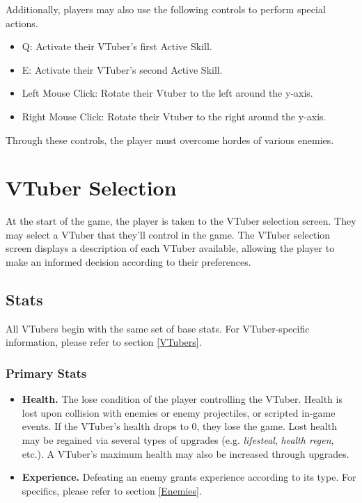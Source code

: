\documentclass[10pt, a4paper]{article}
\begin{document}
\begin{multicols}{2}
	Additionally, players may also use the following controls to perform special actions.

	\begin{itemize}
		\item Q: Activate their VTuber's first Active Skill.
		\item E: Activate their VTuber's second Active Skill.
		\item Left Mouse Click: Rotate their Vtuber to the left around the y-axis.
		\item Right Mouse Click: Rotate their Vtuber to the right around the y-axis.
	\end{itemize}

	Through these controls, the player must overcome hordes of various enemies.

	\section{VTuber Selection}

	At the start of the game, the player is taken to the VTuber selection screen. They may select a VTuber that they'll control in the game. The VTuber selection screen displays a description of each VTuber available, allowing the player to make an informed decision according to their preferences.
  	
  	\subsection{Stats} \label{Player Stats}
  	
  	All VTubers begin with the same set of base stats. For VTuber-specific information, please refer to section \ref{VTubers}.
  	
  	\subsubsection{Primary Stats}

  	\begin{itemize}
  	\item \textbf{Health.} The lose condition of the player controlling the VTuber. Health is lost upon collision with enemies or enemy projectiles, or scripted in-game events. If the VTuber's health drops to 0, they lose the game. Lost health may be regained via several types of upgrades (e.g. \textit{lifesteal}, \textit{health regen}, etc.). A VTuber's maximum health may also be increased through upgrades.

  	\item \textbf{Experience.} Defeating an enemy grants experience according to its type. For specifics, please refer to section \ref{Enemies}. 
  	

\end{itemize}
\end{multicols}
\end{document}
